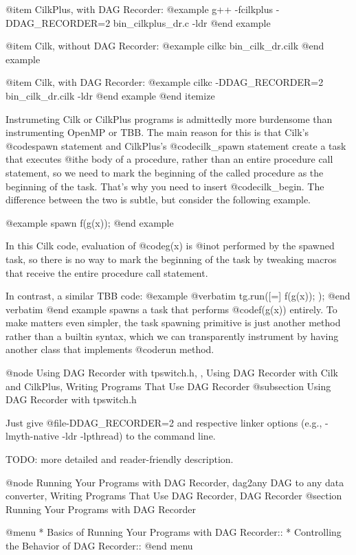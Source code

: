 @item CilkPlus, with DAG Recorder:
@example
g++ -fcilkplus -DDAG_RECORDER=2 bin_cilkplus_dr.c -ldr
@end example

@item Cilk, without DAG Recorder:
@example
cilkc bin_cilk_dr.cilk
@end example

@item Cilk, with DAG Recorder:
@example
cilkc -DDAG_RECORDER=2 bin_cilk_dr.cilk -ldr
@end example
@end itemize

Instrumeting Cilk or CilkPlus programs is admittedly more burdensome
than instrumenting OpenMP or TBB.  The main reason for this is that
Cilk's @code{spawn} statement and CilkPlus's @code{cilk_spawn} 
statement create a task
that executes @i{the body of a procedure}, rather than an entire
procedure call statement, so we need to mark the beginning of the called
procedure as the beginning of the task.  That's why you need to insert
@code{cilk_begin}.  The difference between the two is subtle, but
consider the following example.

@example
spawn f(g(x));
@end example

In this Cilk code, evaluation of @code{g(x)} is @i{not} performed by the
spawned task, so there is no way to mark the beginning of the task by
tweaking macros that receive the entire procedure call statement.

In contrast, a similar TBB code:
@example
@verbatim
tg.run([=] { f(g(x)); });
@end verbatim
@end example
spawns a task that performs @code{f(g(x))} entirely.  
To make matters even simpler, the task spawning primitive
is just another method rather than a builtin syntax, 
which we can transparently instrument by having another 
class that implements @code{run} method.



@node Using DAG Recorder with tpswitch.h,  , Using DAG Recorder with Cilk and CilkPlus, Writing Programs That Use DAG Recorder
@subsection Using DAG Recorder with tpswitch.h

Just give @file{-DDAG_RECORDER=2} 
and respective linker options (e.g., -lmyth-native -ldr -lpthread)
to the command line.

TODO: more detailed and reader-friendly description.

@node Running Your Programs with DAG Recorder, dag2any DAG to any data converter, Writing Programs That Use DAG Recorder, DAG Recorder
@section Running Your Programs with DAG Recorder

@menu
* Basics of Running Your Programs with DAG Recorder::
* Controlling the Behavior of DAG Recorder::
@end menu

